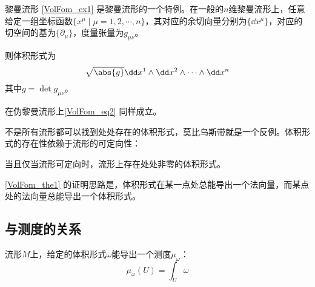 \begin{example}{黎曼流形}
\autoref{VolFom_ex1} 是黎曼流形的一个特例。在一般的$n$维黎曼流形上，任意给定一组坐标函数$\{x^\mu\mid \mu=1, 2, \cdots, n\}$，其对应的余切向量分别为$\{\dd x^\mu\}$，对应的切空间的基为$\{\partial_\mu\}$，度量张量为$g_{\mu\nu}$。

则体积形式为
\begin{equation}\label{VolFom_eq2}
\sqrt{\abs{g}}\dd x^1\wedge \dd x^2\wedge \cdots \wedge \dd x^n
\end{equation}
其中$g=\det g_{\mu\nu}$。

在伪黎曼流形上\autoref{VolFom_eq2} 同样成立。
\end{example}



不是所有流形都可以找到处处存在的体积形式，莫比乌斯带就是一个反例。体积形式的存在性依赖于流形的可定向性：


\begin{theorem}{}\label{VolFom_the1}
当且仅当流形可定向时，流形上存在处处非零的体积形式。
\end{theorem}

\autoref{VolFom_the1} 的证明思路是，体积形式在某一点处总能导出一个法向量，而某点处的法向量总能导出一个体积形式。



\subsection{与测度的关系}


流形$M$上，给定的体积形式$\omega$能导出一个测度$\mu_{\omega}$：
\begin{equation}
\mu_\omega(U) = \int_U \omega
\end{equation}
















